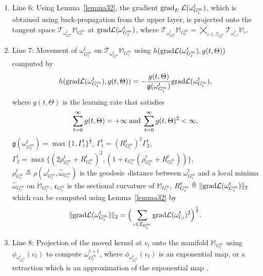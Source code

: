 \documentclass[10pt,journal,compsoc]{IEEEtran}
\newcommand{\gr}{{\rm grad}}
\theoremstyle{definition}
\theoremstyle{definition}
\theoremstyle{remark}
\theoremstyle{remark}
\theoremstyle{remark}
\begin{document}
 
\begin{enumerate}[leftmargin=*]
	\item Line 6: Using Lemma~\ref{lemma32}, the gradient  $\gr_E \; \mathcal{L}(\omega_{G^m_l}^{t})$, which is obtained using back-propagation from the upper layer, is projected onto the tangent space $\mathcal{T}_{\omega^t_{G^m_l}} \mathbb{M}_{G^m_l}$ at $\gr \mathcal{L}(\omega_{G^m_l}^{t})$, where
	$\mathcal{T}_{\omega^t_{G^m_l}} \mathbb{M}_{G^m_l} = \bigtimes \limits _{\iota \in \mathcal{I}_{G^m_l}} \mathcal{T}_{\omega^t_{\iota,l}} \mathbb{M}_{\iota}$.

	 
	\item Line 7: Movement of $\omega^t_{G^m_l}$ on $\mathcal{T}_{\omega^t_{G^m_l}} \mathbb{M}_{G^m_l}$ using $ h(\gr \mathcal{L}(\omega_{G^m_l}^{t}), g(t,\Theta))$ computed by
	\begin{equation}
	h(\gr \mathcal{L}(\omega_{G^m_l}^{t}), g(t,\Theta)) = -\frac{g(t,\Theta)}{\mathfrak{g}(\omega_{G^m_l}^t)}\gr \mathcal{L}(\omega_{G^m_l}^{t}),
	\label{eq:steps}
	\end{equation}
	where $g(t,\Theta)$ is the learning rate that satisfies
\begin{equation}
\sum_{t=0} ^{\infty} g(t,\Theta) = +\infty \; {\rm and} \; \sum_{t=0} ^{\infty} g(t,\Theta)^2 < \infty,
\label{eq:rate}
\end{equation} 
 $\mathfrak{g}(\omega_{G^m_l}^t) = \max\{ 1,\Gamma_1^t\}^{\frac{1}{2}}$, $\Gamma_1^t = (R_{G^m_l}^{t})^2 \Gamma_2^t$, ${\Gamma_2^t = \max \{(2\rho_{G^m_l}^{t} + R_{G^m_l}^{t})^2, (1+\mathfrak{c}_{G^m_l}(\rho_{G^m_l}^{t} + R_{G^m_l}^{t}))\} }$, $\rho_{G^m_l}^{t} \triangleq \rho(\omega_{G^m_l}^t, \hat{\omega}_{G^m_l}) $ is the geodesic distance between $\omega_{G^m_l}^t$ and a local minima $\hat{\omega}_{G^m_l}$ on $\mathbb{M}_{G^m_l}$, $\mathfrak{c}_{G^m_l}$ is the sectional curvature of $\mathbb{M}_{G^m_l}$, $R_{G^m_l}^{t} \triangleq  \| \gr \mathcal{L}(\omega_{G^m_l}^{t})  \|_2$ which can be computed using Lemma~\ref{lemma32} by
\begin{equation}
 \| \gr \mathcal{L}(\omega_{G^m_l}^{t})  \|_2 = \Big (\sum \limits_{\iota \in \mathcal{I}_{G^m_l}} \gr \mathcal{L}(\omega_{l,\iota}^{t})^2 \Big)^{\frac{1}{2}}.
 \label{eq:grad_norm}
\end{equation} 

	
	\item Line 8: Projection of the moved kernel at $v_t$ onto the manifold $\mathbb{M}_{G^m_l}$ using $\phi_{\omega_{G^m_l}^t}(  v_t)$ to compute $\omega^{t+1}_{G^m_l}$, where $\phi_{\omega_{G^m_l}^t}(  v_t)$ is an exponential map, or a retraction which is an approximation of the exponential map \cite{absil_retr}.
\end{enumerate}   
\end{document}
